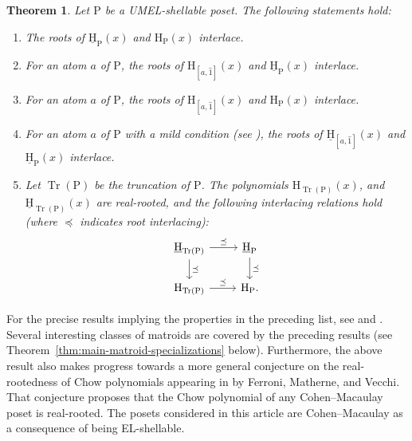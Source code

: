 \documentclass[11pt,a4paper]{amsart}
\theoremstyle{results}
\newtheorem{maintheorem}[thm]{Theorem}
\theoremstyle{definitions}
\def\P{\mathbb{P}}
\newcommand{\uH}{\underline{\mathrm{H}}}
\newcommand{\Tr}{\operatorname{Tr}}
\newcommand{\un}{\hat{1}}
\renewcommand{\P}{\mathrm{P}}
\renewcommand{\H}{\mathrm{H}}
\renewcommand{\hat}{\widehat}
\begin{document}
\begin{maintheorem}
\label{thm:main-interlacing-intro}
    Let $\P$ be a UMEL-shellable poset. The following statements hold: 
    \begin{enumerate}[\normalfont(i)]
        \item The roots of $\uH_{\P}(x)$ and $\H_{\P}(x)$ interlace. 
        \item For an atom $a$ of $\P$, the roots of $\H_{[a, \un]}(x)$ and $\uH_{\P}(x)$ 
        interlace. 
        \item For an atom $a$ of $\P$, the roots of $\H_{[a, \un]}(x)$ and $\H_{\P}(x)$ 
        interlace.
        \item For an atom $a$ of $\P$ with a mild condition (see ), the roots of $\uH_{[a, \un]}(x)$ and $\uH_{\P}(x)$ 
        interlace. 
        \item Let $\Tr(\P)$ be the truncation of $\P$. The polynomials $\H_{\Tr(\P)}(x)$, and $\uH_{\Tr(\P)}(x)$ are real-rooted, and the following interlacing relations hold (where $\preceq$ indicates root interlacing): 
        \[
        \begin{tikzcd}
        \uH_{\Tr(\P)} \arrow[r, "\preceq"] \arrow[d, "\preceq"] & \uH_{\P} \arrow[d, "\preceq"] \\
        \H_{\Tr(\P)} \arrow[r, "\preceq"] & \H_{\P}.
        \end{tikzcd}
        \] 
    \end{enumerate}
\end{maintheorem}

For the precise results implying the properties in the preceding list, see  and . Several interesting classes of matroids are covered by the preceding results (see Theorem~\ref{thm:main-matroid-specializations} below). Furthermore, the above result also makes progress towards a more general conjecture on the real-rootedness of Chow polynomials appearing in \cite[Conjecture~1.5]{ferroni-matherne-vecchi} by Ferroni, Matherne, and Vecchi. That conjecture proposes that the Chow polynomial of any Cohen--Macaulay poset is real-rooted. The posets considered in this article are Cohen--Macaulay as a consequence of being EL-shellable.
\end{document}
